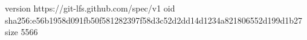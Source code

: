 version https://git-lfs.github.com/spec/v1
oid sha256:e56b1958d091fb50f581282397f58d3c52d2dd14d1234a821806552d199d1b27
size 5566
